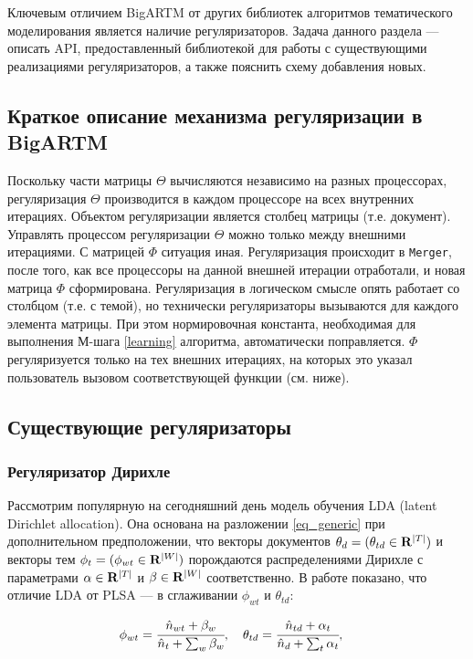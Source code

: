 
Ключевым отличием BigARTM от других библиотек алгоритмов тематического моделирования является наличие регуляризаторов. Задача данного раздела --- описать API, предоставленный библиотекой для работы с существующими реализациями регуляризаторов, а также пояснить схему добавления новых.

\subsection{Краткое описание механизма регуляризации в BigARTM}
Поскольку части матрицы $\Theta$ вычисляются независимо на разных процессорах, регуляризация $\Theta$ производится в каждом процессоре на всех внутренних итерациях. Объектом регуляризации является столбец матрицы (т.е. документ). Управлять процессом регуляризации $\Theta$ можно только между внешними итерациями. С матрицей $\Phi$ ситуация иная. Регуляризация происходит в \verb|Merger|, после того, как все процессоры на данной внешней итерации отработали, и новая матрица $\Phi$ сформирована. Регуляризация в логическом смысле опять работает со столбцом (т.е. с темой), но технически регуляризаторы вызываются для каждого элемента матрицы. При этом нормировочная константа, необходимая для выполнения М-шага \ref{learning} алгоритма, автоматически поправляется. $\Phi$ регуляризуется только на тех внешних итерациях, на которых это указал пользователь вызовом соответствующей функции (см. ниже). 

\subsection{Существующие регуляризаторы}

\subsubsection{Регуляризатор Дирихле}

Рассмотрим популярную на сегодняшний день модель обучения LDA (latent Dirichlet allocation). Она основана на разложении \ref{eq_generic} при дополнительном предположении, что векторы документов $\theta_d = (\theta_{td} \in {\bf R}^{|T|})$ и векторы тем $\phi_t = (\phi_{wt} \in {\bf R}^{|W|})$ порождаются распределениями Дирихле с параметрами $\alpha \in {\bf R}^{|T|}$ и $\beta \in {\bf R}^{|W|}$ соответственно. В работе \cite{voron_potap_14} показано, что отличие LDA от PLSA --- в сглаживании $\phi_{wt}$ и $\theta_{td}$:

\begin{equation}
	\phi_{wt} = \cfrac{\hat n_{wt} + \beta_w}{\hat n_t + \sum_w \beta_w}, \quad 
 	\theta_{td} = \cfrac{\hat n_{td} + \alpha_t}{\hat n_d + \sum_t \alpha_t}, \quad
\end{equation}

